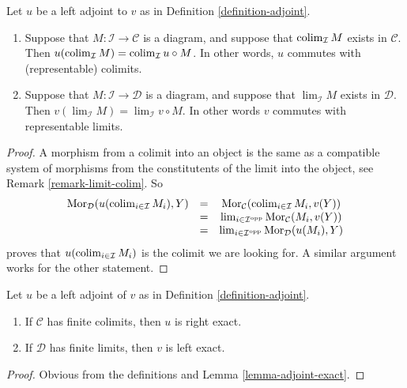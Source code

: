 \begin{lemma}
\label{lemma-adjoint-exact}
Let $u$ be a left adjoint to $v$ as in Definition \ref{definition-adjoint}.
\begin{enumerate}
\item Suppose that $M : \mathcal{I} \to \mathcal{C}$ is a diagram,
and suppose that $\mathop{\rm colim}\nolimits_{\mathcal{I}} M$ exists in
$\mathcal{C}$. Then $u(\mathop{\rm colim}\nolimits_{\mathcal{I}} M) =
\mathop{\rm colim}\nolimits_{\mathcal{I}} u \circ M$. In other words,
$u$ commutes with (representable) colimits.
\item Suppose that $M : \mathcal{I} \to \mathcal{D}$ is a diagram,
and suppose that $\lim_{\mathcal{I}} M$ exists in
$\mathcal{D}$. Then $v(\lim_{\mathcal{I}} M) =
\lim_{\mathcal{I}} v \circ M$. In other words $v$ commutes
with representable limits.
\end{enumerate}
\end{lemma}

\begin{proof}
A morphism from a colimit into an object is the same as a compatible
system of morphisms from the constitutents of the limit into the
object, see Remark \ref{remark-limit-colim}. So
$$
\begin{matrix}
\text{Mor}_{\mathcal{D}}(u(\mathop{\rm colim}\nolimits_{i \in \mathcal{I}} M_i), Y) &
= & \text{Mor}_{\mathcal{C}}(\mathop{\rm colim}\nolimits_{i \in \mathcal{I}} M_i, v(Y)) \\
& = &
\mathop{\rm lim}\nolimits_{i \in \mathcal{I}^{\text{opp}}}
\text{Mor}_{\mathcal{C}}(M_i, v(Y)) \\
& = &
\mathop{\rm lim}\nolimits_{i \in \mathcal{I}^{\text{opp}}}
\text{Mor}_{\mathcal{D}}(u(M_i), Y)
\end{matrix}
$$
proves that $u(\mathop{\rm colim}\nolimits_{i \in \mathcal{I}} M_i)$ is
the colimit we are looking for.
A similar argument works for the other statement.
\end{proof}

\begin{lemma}
\label{lemma-exact-adjoint}
Let $u$ be a left adjoint of $v$ as in Definition \ref{definition-adjoint}.
\begin{enumerate}
\item If $\mathcal{C}$ has finite colimits, then $u$ is right exact.
\item If $\mathcal{D}$ has finite limits, then $v$ is left exact.
\end{enumerate}
\end{lemma}

\begin{proof}
Obvious from the definitions and Lemma \ref{lemma-adjoint-exact}.
\end{proof}


